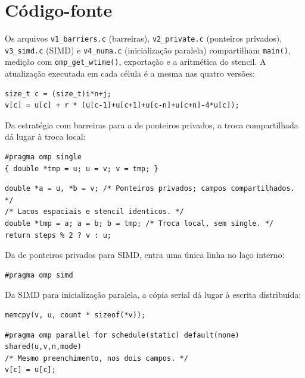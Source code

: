\documentclass[11pt,letterpaper]{article}
\begin{document}
\appendix\newpage
\section{Código-fonte}
Os arquivos \texttt{v1\_barriers.c} (barreiras), \texttt{v2\_private.c} (ponteiros privados), \texttt{v3\_simd.c} (SIMD) e \texttt{v4\_numa.c} (inicialização paralela) compartilham \texttt{main()}, medição com \texttt{omp\_get\_wtime()}, exportação e a aritmética do stencil. A atualização executada em cada célula é a mesma nas quatro versões:
\begin{lstlisting}[caption={Núcleo comum do stencil.}]
size_t c = (size_t)i*n+j;
v[c] = u[c] + r * (u[c-1]+u[c+1]+u[c-n]+u[c+n]-4*u[c]);
\end{lstlisting}
Da estratégia com barreiras para a de ponteiros privados, a troca compartilhada dá lugar à troca local:
\begin{lstlisting}[caption={v1: troca em single, segunda barreira do passo.}]
#pragma omp single
{ double *tmp = u; u = v; v = tmp; }
\end{lstlisting}
\begin{lstlisting}[caption={v2: ponteiros privados e troca local.}]
double *a = u, *b = v; /* Ponteiros privados; campos compartilhados. */
/* Lacos espaciais e stencil identicos. */
double *tmp = a; a = b; b = tmp; /* Troca local, sem single. */
return steps % 2 ? v : u;
\end{lstlisting}
Da de ponteiros privados para SIMD, entra uma única linha no laço interno:
\begin{lstlisting}[caption={v3: acréscimo sobre v2.}]
#pragma omp simd
\end{lstlisting}
Da SIMD para inicialização paralela, a cópia serial dá lugar à escrita distribuída:
\begin{lstlisting}[caption={v3 e anteriores: inicialização serial.}]
memcpy(v, u, count * sizeof(*v));
\end{lstlisting}
\begin{lstlisting}[caption={v4: inicialização distribuída.}]
#pragma omp parallel for schedule(static) default(none) shared(u,v,n,mode)
/* Mesmo preenchimento, nos dois campos. */
v[c] = u[c];
\end{lstlisting}
\end{document}

